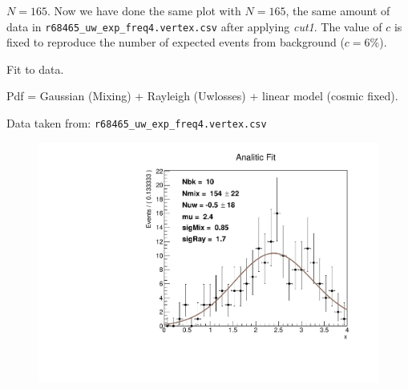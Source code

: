 \documentclass[9pt]{beamer}
\newcommand{\nologo}{\setbeamertemplate{logo}{}}
\begin{document}
{\nologo
\begin{frame}{$N = 165$.}
Now we have done the same plot with $N = 165$, the same amount of data in \texttt{r68465\_uw\_exp\_freq4.vertex.csv} after applying \textit{cut1}. The value of $c$ is fixed to reproduce the number of expected events from background ($c = 6\%$).
\begin{figure}
\end{figure}
\end{frame}
}
\begin{frame}{Fit to data.}

Pdf = Gaussian (Mixing) + Rayleigh (Uwlosses) + linear model (cosmic fixed).

Data taken from: \texttt{r68465\_uw\_exp\_freq4.vertex.csv}

\begin{figure}[hbtp]
\centering
\includegraphics[width = 0.70 \textwidth]{./SingleModel/TuttoAnalitico.pdf}
\end{figure}
\end{frame}
\end{document}
